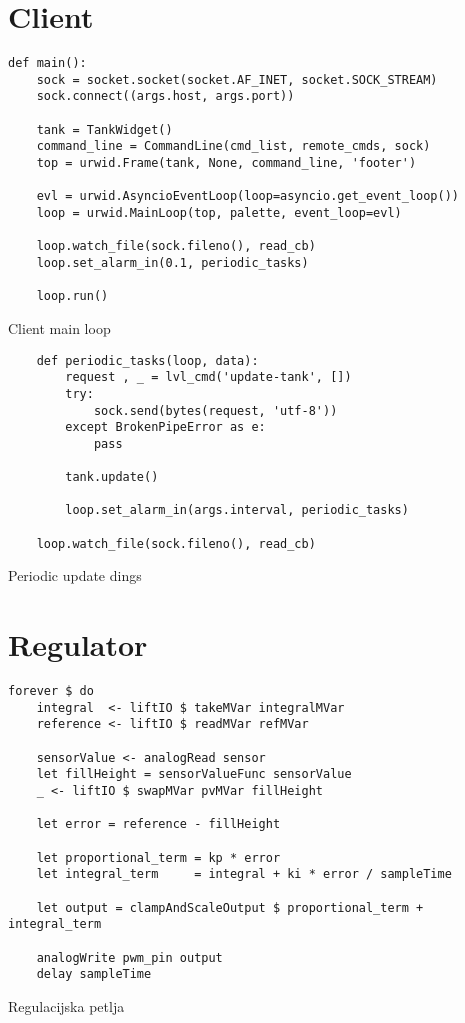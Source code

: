 \newpage
\section{Client}
\begin{listing}[H]
\centering
\begin{verbatim}
def main():
    sock = socket.socket(socket.AF_INET, socket.SOCK_STREAM)
    sock.connect((args.host, args.port))

    tank = TankWidget()
    command_line = CommandLine(cmd_list, remote_cmds, sock)
    top = urwid.Frame(tank, None, command_line, 'footer')

    evl = urwid.AsyncioEventLoop(loop=asyncio.get_event_loop())
    loop = urwid.MainLoop(top, palette, event_loop=evl)

    loop.watch_file(sock.fileno(), read_cb)
    loop.set_alarm_in(0.1, periodic_tasks)

    loop.run()
\end{verbatim}
\caption{Client main loop}
\label{lst:client main}
\end{listing}

\begin{listing}[H]
\centering
\begin{verbatim}
    def periodic_tasks(loop, data):
        request , _ = lvl_cmd('update-tank', [])
        try:
            sock.send(bytes(request, 'utf-8'))
        except BrokenPipeError as e:
            pass

        tank.update()

        loop.set_alarm_in(args.interval, periodic_tasks)

    loop.watch_file(sock.fileno(), read_cb)
\end{verbatim}
\caption{Periodic update dings}
\label{lst:periodic tasks}
\end{listing}


\newpage
\section{Regulator}

\begin{listing}[H]
\centering
\begin{verbatim}
forever $ do
    integral  <- liftIO $ takeMVar integralMVar
    reference <- liftIO $ readMVar refMVar

    sensorValue <- analogRead sensor
    let fillHeight = sensorValueFunc sensorValue
    _ <- liftIO $ swapMVar pvMVar fillHeight

    let error = reference - fillHeight

    let proportional_term = kp * error
    let integral_term     = integral + ki * error / sampleTime

    let output = clampAndScaleOutput $ proportional_term + integral_term

    analogWrite pwm_pin output
    delay sampleTime
\end{verbatim}
\caption{Regulacijska petlja}
\label{lst:regulator}
\end{listing}


